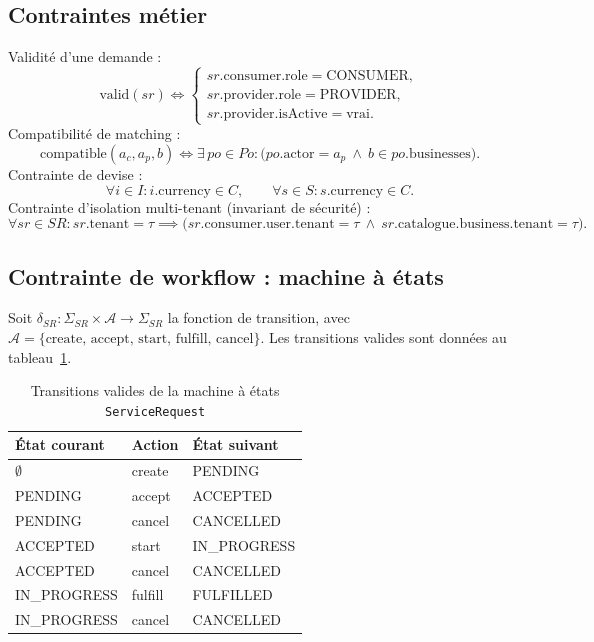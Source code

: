 \subsection{Contraintes métier}
Validité d'une demande :
\[
\text{valid}(sr) \iff
\begin{cases}
sr.\text{consumer}.\text{role} = \text{CONSUMER},\\
sr.\text{provider}.\text{role} = \text{PROVIDER},\\
sr.\text{provider}.\text{isActive} = \text{vrai}.
\end{cases}
\]
Compatibilité de matching :
\[
\text{compatible}(a_c, a_p, b) \iff \exists\, po \in Po :
\big(po.\text{actor} = a_p \ \wedge\ b \in po.\text{businesses}\big).
\]
Contrainte de devise :
\[
\forall i \in I : i.\text{currency} \in C, \qquad \forall s \in S : s.\text{currency} \in C.
\]
Contrainte d'isolation multi-tenant (invariant de sécurité) :
\[
\forall sr \in SR : sr.\text{tenant} = \tau \implies
\big(sr.\text{consumer}.\text{user}.\text{tenant} = \tau \ \wedge\
      sr.\text{catalogue}.\text{business}.\text{tenant} = \tau\big).
\]

\subsection{Contrainte de workflow : machine à états}
Soit $\delta_{SR} : \Sigma_{SR} \times \mathcal{A} \to \Sigma_{SR}$ la fonction de
transition, avec $\mathcal{A} = \{\text{create, accept, start, fulfill, cancel}\}$. Les
transitions valides sont données au tableau~\ref{tab:fsm-math}.

\begin{table}[H]
\centering
\caption{Transitions valides de la machine à états \texttt{ServiceRequest}}
\label{tab:fsm-math}
\renewcommand{\arraystretch}{1.2}\footnotesize
\begin{tabular}{lll}
\toprule
\textbf{État courant} & \textbf{Action} & \textbf{État suivant} \\
\midrule
$\emptyset$    & create  & PENDING \\
PENDING        & accept  & ACCEPTED \\
PENDING        & cancel  & CANCELLED \\
ACCEPTED       & start   & IN\_PROGRESS \\
ACCEPTED       & cancel  & CANCELLED \\
IN\_PROGRESS   & fulfill & FULFILLED \\
IN\_PROGRESS   & cancel  & CANCELLED \\
\bottomrule
\end{tabular}
\end{table}

